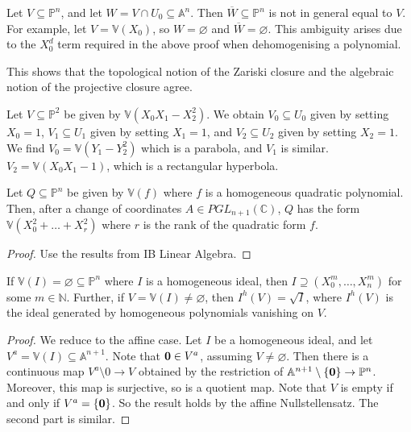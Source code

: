\begin{remark}
    Let \( V \subseteq \mathbb P^n \), and let \( W = V \cap U_0 \subseteq \mathbb A^n \).
    Then \( \overline W \subseteq \mathbb P^n \) is not in general equal to \( V \).
    For example, let \( V = \mathbb V(X_0) \), so \( W = \varnothing \) and \( \overline W = \varnothing \).
    This ambiguity arises due to the \( X_0^d \) term required in the above proof when dehomogenising a polynomial.
\end{remark}
This shows that the topological notion of the Zariski closure and the algebraic notion of the projective closure agree.
\begin{example}
    Let \( V \subseteq \mathbb P^2 \) be given by \( \mathbb V(X_0 X_1 - X_2^2) \).
    We obtain \( V_0 \subseteq U_0 \) given by setting \( X_0 = 1 \), \( V_1 \subseteq U_1 \) given by setting \( X_1 = 1 \), and \( V_2 \subseteq U_2 \) given by setting \( X_2 = 1 \).
    We find \( V_0 = \mathbb V(Y_1 - Y_2^2) \) which is a parabola, and \( V_1 \) is similar.
    \( V_2 = \mathbb V(X_0 X_1 - 1) \), which is a rectangular hyperbola.
\end{example}
\begin{theorem}
    Let \( Q \subseteq \mathbb P^n \) be given by \( \mathbb V(f) \) where \( f \) is a homogeneous quadratic polynomial.
    Then, after a change of coordinates \( A \in PGL_{n+1}(\mathbb C) \), \( Q \) has the form \( \mathbb V(X_0^2 + \dots + X_r^2) \) where \( r \) is the rank of the quadratic form \( f \).
\end{theorem}
\begin{proof}
    Use the results from IB Linear Algebra.
\end{proof}
\begin{theorem}
    If \( \mathbb V(I) = \varnothing \subseteq \mathbb P^n \) where \( I \) is a homogeneous ideal, then \( I \supseteq (X_0^m, \dots, X_n^m) \) for some \( m \in \mathbb N \).
    Further, if \( V = \mathbb V(I) \neq \varnothing \), then \( I^h(V) = \sqrt{I} \), where \( I^h(V) \) is the ideal generated by homogeneous polynomials vanishing on \( V \).
\end{theorem}
\begin{proof}
    We reduce to the affine case.
    Let \( I \) be a homogeneous ideal, and let \( V^a = \mathbb V(I) \subseteq \mathbb A^{n+1} \).
    Note that \( \vb 0 \in V^a \), assuming \( V \neq \varnothing \).
    Then there is a continuous map \( V^a \setminus \qty{0} \to V \) obtained by the restriction of \( \mathbb A^{n+1} \setminus \qty{\vb 0} \to \mathbb P^n \).
    Moreover, this map is surjective, so is a quotient map.
    Note that \( V \) is empty if and only if \( V^a = \qty{\vb 0} \).
    So the result holds by the affine Nullstellensatz.
    The second part is similar.
\end{proof}
